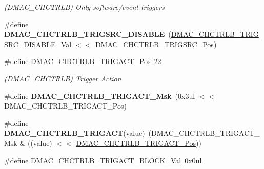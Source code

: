 \begin{DoxyCompactItemize}
\begin{DoxyCompactList}\small\item\em (D\+M\+A\+C\+\_\+\+C\+H\+C\+T\+R\+L\+B) Only software/event triggers \end{DoxyCompactList}\item 
\hypertarget{group___s_a_m_l21___d_m_a_c_gad260fac8687057a56b699d6387570e7f}{}\#define {\bfseries D\+M\+A\+C\+\_\+\+C\+H\+C\+T\+R\+L\+B\+\_\+\+T\+R\+I\+G\+S\+R\+C\+\_\+\+D\+I\+S\+A\+B\+L\+E}~(\hyperlink{group___s_a_m_l21___d_m_a_c_ga855c3e6786f7b074a870d31d85888a87}{D\+M\+A\+C\+\_\+\+C\+H\+C\+T\+R\+L\+B\+\_\+\+T\+R\+I\+G\+S\+R\+C\+\_\+\+D\+I\+S\+A\+B\+L\+E\+\_\+\+Val} $<$$<$ \hyperlink{group___s_a_m_l21___d_m_a_c_ga4716e5db96b3eb256a9f899457c3375c}{D\+M\+A\+C\+\_\+\+C\+H\+C\+T\+R\+L\+B\+\_\+\+T\+R\+I\+G\+S\+R\+C\+\_\+\+Pos})\label{group___s_a_m_l21___d_m_a_c_gad260fac8687057a56b699d6387570e7f}

\item 
\hypertarget{group___s_a_m_l21___d_m_a_c_gaada77814aa3858a4b49aabef88429c31}{}\#define \hyperlink{group___s_a_m_l21___d_m_a_c_gaada77814aa3858a4b49aabef88429c31}{D\+M\+A\+C\+\_\+\+C\+H\+C\+T\+R\+L\+B\+\_\+\+T\+R\+I\+G\+A\+C\+T\+\_\+\+Pos}~22\label{group___s_a_m_l21___d_m_a_c_gaada77814aa3858a4b49aabef88429c31}

\begin{DoxyCompactList}\small\item\em (D\+M\+A\+C\+\_\+\+C\+H\+C\+T\+R\+L\+B) Trigger Action \end{DoxyCompactList}\item 
\hypertarget{group___s_a_m_l21___d_m_a_c_ga539afbe9e0308fd3b76b4ae7ff9db0ff}{}\#define {\bfseries D\+M\+A\+C\+\_\+\+C\+H\+C\+T\+R\+L\+B\+\_\+\+T\+R\+I\+G\+A\+C\+T\+\_\+\+Msk}~(0x3ul $<$$<$ D\+M\+A\+C\+\_\+\+C\+H\+C\+T\+R\+L\+B\+\_\+\+T\+R\+I\+G\+A\+C\+T\+\_\+\+Pos)\label{group___s_a_m_l21___d_m_a_c_ga539afbe9e0308fd3b76b4ae7ff9db0ff}

\item 
\hypertarget{group___s_a_m_l21___d_m_a_c_gabd1ec3b5b2a9f0a0c59797a186296acd}{}\#define {\bfseries D\+M\+A\+C\+\_\+\+C\+H\+C\+T\+R\+L\+B\+\_\+\+T\+R\+I\+G\+A\+C\+T}(value)~(D\+M\+A\+C\+\_\+\+C\+H\+C\+T\+R\+L\+B\+\_\+\+T\+R\+I\+G\+A\+C\+T\+\_\+\+Msk \& ((value) $<$$<$ \hyperlink{group___s_a_m_l21___d_m_a_c_gaada77814aa3858a4b49aabef88429c31}{D\+M\+A\+C\+\_\+\+C\+H\+C\+T\+R\+L\+B\+\_\+\+T\+R\+I\+G\+A\+C\+T\+\_\+\+Pos}))\label{group___s_a_m_l21___d_m_a_c_gabd1ec3b5b2a9f0a0c59797a186296acd}

\item 
\hypertarget{group___s_a_m_l21___d_m_a_c_gaa54bf830756309b4ec082836357fc93f}{}\#define \hyperlink{group___s_a_m_l21___d_m_a_c_gaa54bf830756309b4ec082836357fc93f}{D\+M\+A\+C\+\_\+\+C\+H\+C\+T\+R\+L\+B\+\_\+\+T\+R\+I\+G\+A\+C\+T\+\_\+\+B\+L\+O\+C\+K\+\_\+\+Val}~0x0ul\label{group___s_a_m_l21___d_m_a_c_gaa54bf830756309b4ec082836357fc93f}


\end{DoxyCompactItemize}
